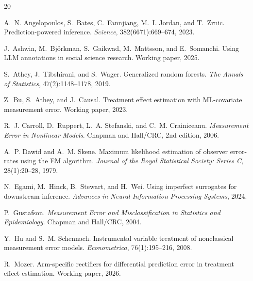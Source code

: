 \documentclass[11pt,a4paper]{article}
\begin{document}
\begin{thebibliography}{20}

A.~N. Angelopoulos, S.~Bates, C.~Fannjiang, M.~I. Jordan, and T.~Zrnic.
\newblock Prediction-powered inference.
\newblock \emph{Science}, 382(6671):669--674, 2023.

J.~Ashwin, M.~Björkman, S.~Gaikwad, M.~Mattsson, and E.~Somanchi.
\newblock Using {LLM} annotations in social science research.
\newblock Working paper, 2025.

S.~Athey, J.~Tibshirani, and S.~Wager.
\newblock Generalized random forests.
\newblock \emph{The Annals of Statistics}, 47(2):1148--1178, 2019.

Z.~Bu, S.~Athey, and J.~Causal.
\newblock Treatment effect estimation with {ML}-covariate measurement error.
\newblock Working paper, 2023.

R.~J. Carroll, D.~Ruppert, L.~A. Stefanski, and C.~M. Crainiceanu.
\newblock \emph{Measurement Error in Nonlinear Models}.
\newblock Chapman and Hall/CRC, 2nd edition, 2006.

A.~P. Dawid and A.~M. Skene.
\newblock Maximum likelihood estimation of observer error-rates using the {EM} algorithm.
\newblock \emph{Journal of the Royal Statistical Society: Series C}, 28(1):20--28, 1979.

N.~Egami, M.~Hinck, B.~Stewart, and H.~Wei.
\newblock Using imperfect surrogates for downstream inference.
\newblock \emph{Advances in Neural Information Processing Systems}, 2024.

P.~Gustafson.
\newblock \emph{Measurement Error and Misclassification in Statistics and Epidemiology}.
\newblock Chapman and Hall/CRC, 2004.

Y.~Hu and S.~M. Schennach.
\newblock Instrumental variable treatment of nonclassical measurement error models.
\newblock \emph{Econometrica}, 76(1):195--216, 2008.

R.~Mozer.
\newblock Arm-specific rectifiers for differential prediction error in treatment effect estimation.
\newblock Working paper, 2026.


\end{thebibliography}
\end{document}
